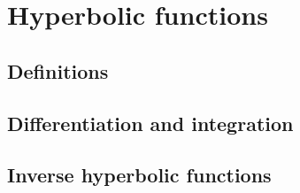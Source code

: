 \chapter{Hyperbolic functions}
\section{Definitions}
\section{Differentiation and integration}
\section{Inverse hyperbolic functions}